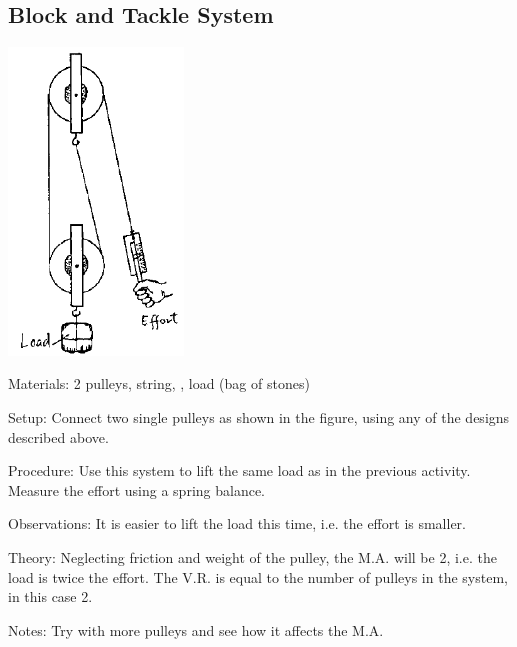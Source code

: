 \begin{multicols}{2}
\vfill
\columnbreak

\subsection{Block and Tackle System}

\begin{center}
\includegraphics[width=0.35\textwidth]{./img/source/pulley-system.png}
\end{center}

\begin{description*}
\item[Materials:]{2 pulleys, string, , load (bag of stones)}
\item[Setup:]{Connect two single pulleys as shown in the figure, using any of the designs described above.}
\item[Procedure:]{Use this system to lift the same load as in the previous activity. Measure the effort using a spring balance.}
\item[Observations:]{It is easier to lift the load this time, i.e. the effort is smaller.}
\item[Theory:]{Neglecting friction and weight of the pulley, the M.A. will be 2, i.e. the load is twice the effort. The V.R. is equal to the number of pulleys in the system, in this case 2.}
\item[Notes:]{Try with more pulleys and see how it affects the M.A.}
\end{description*}


\end{multicols}
